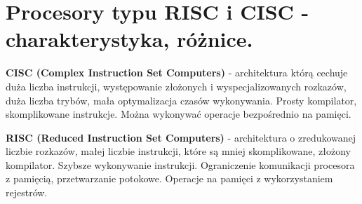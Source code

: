 \documentclass[../main.tex]{subfiles}
\begin{document}
\section{Procesory typu RISC i CISC - charakterystyka, różnice.}

\textbf{CISC (Complex Instruction Set Computers)} - architektura którą cechuje duża liczba instrukcji,
występowanie złożonych i wyspecjalizowanych rozkazów, duża liczba trybów, mała optymalizacja
czasów wykonywania. Prosty kompilator, skomplikowane instrukcje. Można wykonywać operacje
bezpośrednio na pamięci.

\textbf{RISC (Reduced Instruction Set Computers)} - architektura o zredukowanej liczbie rozkazów, małej liczbie
instrukcji, które są mniej skomplikowane, złożony kompilator. Szybsze wykonywanie instrukcji.
Ograniczenie komunikacji procesora z pamięcią, przetwarzanie potokowe. Operacje na pamięci z
wykorzystaniem rejestrów.
\end{document}
